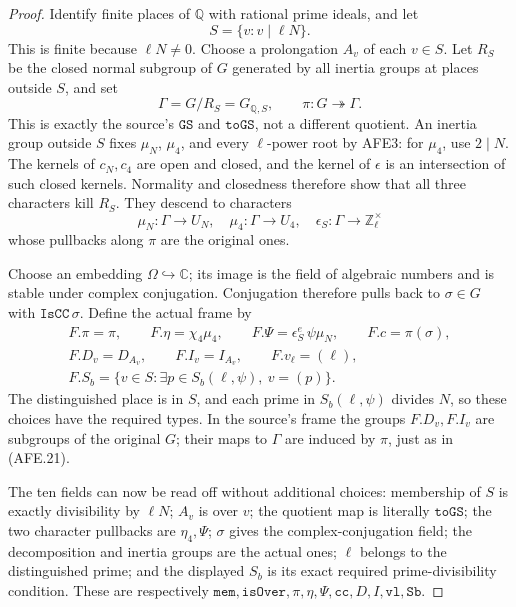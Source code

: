 \begin{proof}
Identify finite places of \(\mathbb Q\) with rational
prime ideals, and let
\[
       S=\{v:v\mid\ell N\}.
 \]
This is finite because \(\ell N\ne0\).
Choose a prolongation \(A_v\) of each \(v\in S\).
Let \(R_S\) be the closed normal subgroup of \(G\)
generated by all inertia groups at places outside
\(S\), and set
\[
       \Gamma=G/R_S=G_{\mathbb Q,S},\qquad
       \pi:G\twoheadrightarrow\Gamma.
 \]
This is exactly the source's \(\texttt{GS}\) and
\(\texttt{toGS}\), not a different quotient.
An inertia group outside \(S\) fixes \(\mu_N\),
\(\mu_4\), and every \(\ell\)-power root by AFE3:
for \(\mu_4\), use \(2\mid N\).
The kernels of \(c_N,c_4\) are open and closed,
and the kernel of \(\epsilon\) is an intersection
of such closed kernels.  Normality and closedness
therefore show that all three characters kill \(R_S\).
They descend to characters
\[
       \mu_N:\Gamma\to U_N,\quad
       \mu_4:\Gamma\to U_4,\quad
       \epsilon_S:\Gamma\to\mathbb Z_\ell^\times
 \]
whose pullbacks along \(\pi\) are the original ones.

Choose an embedding \(\Omega\hookrightarrow\mathbb C\);
its image is the field of algebraic numbers and is
stable under complex conjugation.
Conjugation therefore pulls back to
\(\sigma\in G\) with \(\texttt{IsCC}\,\sigma\).
Define the actual frame by
\[
 \begin{gathered}
 F.\pi=\pi,\qquad F.\eta=\chi_4\mu_4,\qquad
 F.\Psi=\epsilon_S^e\,\psi\mu_N,\qquad F.c=\pi(\sigma),\\
 F.D_v=D_{A_v},\qquad F.I_v=I_{A_v},\qquad
 F.v_\ell=(\ell),\\
 F.S_b=\{v\in S:\exists p\in S_b(\ell,\psi),\ v=(p)\}.
 \end{gathered}                                         \tag{AFE.21}
\]
The distinguished place is in \(S\), and each prime
in \(S_b(\ell,\psi)\) divides \(N\), so these choices
have the required types.
In the source's frame the groups \(F.D_v,F.I_v\)
are subgroups of the original \(G\); their maps to
\(\Gamma\) are induced by \(\pi\), just as in (AFE.21).

The ten fields can now be read off without additional
choices: membership of \(S\) is exactly divisibility
by \(\ell N\); \(A_v\) is over \(v\);
the quotient map is literally \(\texttt{toGS}\);
the two character pullbacks are \(\eta_4,\Psi\);
\(\sigma\) gives the complex-conjugation field;
the decomposition and inertia groups are the actual
ones; \(\ell\) belongs to the distinguished prime;
and the displayed \(S_b\) is its exact required
prime-divisibility condition.
These are respectively
\(\texttt{mem},\texttt{isOver},\pi,\eta,\Psi,
\texttt{cc},D,I,\texttt{vl},\texttt{Sb}\).
\end{proof}

